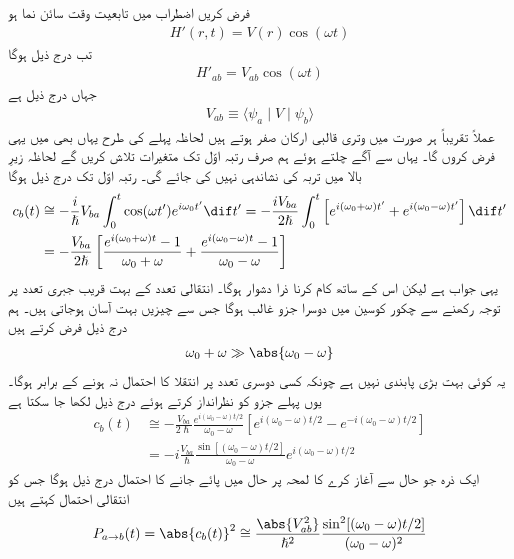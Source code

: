 
فرض کریں اضطراب میں تابعیت وقت سائن نما ہو 
\begin{align}
	H'(r, t) = V(r)\cos(\omega t)
\end{align}
تب درج ذیل ہوگا
\begin{align}
	H'_{ab}=V_{ab}\cos(\omega t)
\end{align}
جہاں  درج ذیل ہے
\begin{align}
	V_{ab}\equiv\langle\psi_a\mid V\mid\psi_b\rangle
\end{align}
عملاً تقریباً ہر صورت میں وتری قالبی ارکان صفر ہوتے ہیں لحاظہ پہلے کی طرح یہاں بھی میں یہی فرض کروں گا۔ یہاں سے آگے چلتے ہوئے ہم صرف رتبہ اوّل تک متغیرات تلاش کریں گے لحاظہ زیرِ بالا میں تربہ کی نشاندہی نہیں کی جائے گی۔ رتبہ اوّل تک درج ذیل ہوگا  
\begin{align}
	c_b(t) &\cong-\frac{i}{\hslash}V_{ba}\int_{0}^{t}\cos(\omega t')e^{i\omega_0 t'}\dif t' = -\frac{iV_{ba}}{2\hslash}\int_{0}^{t}\left[e^{i(\omega_0+\omega)t'}+e^{i(\omega_0-\omega)t'}\right]\dif t' \nonumber \\
	&=-\frac{V_{ba}}{2\hslash}\left[\frac{e^{i(\omega_0+\omega)t}-1}{\omega_0+\omega}+\frac{e^{i(\omega_0-\omega)t}-1}{\omega_0-\omega}\right]
\end{align}
یہی جواب ہے لیکن اس کے ساتھ کام کرنا ذرا دشوار ہوگا۔ انتقالی تعدد  کے بہت قریب جبری تعدد  پر توجہ رکھنے سے چکور کوسین میں دوسرا جزو غالب ہوگا جس سے چیزیں بہت آسان ہوجاتی ہیں۔ ہم درج ذیل فرض کرتے ہیں
\begin{align}
	\omega_0+\omega\gg\abs{\omega_0-\omega}
\end{align}
یہ کوئی بہت بڑی پابندی نہیں ہے چونکہ کسی دوسری تعدد پر انتقلا کا احتمال نہ ہونے کے برابر ہوگا۔ یوں پہلے جزو کو نظرانداز کرتے ہوئے درج ذیل لکھا جا سکتا ہے
\begin{align}
	c_b(t) &\cong-\frac{V_{ba}}{2\hslash}\frac{e^{i(\omega_0-\omega)t/2}}{\omega_0-\omega}\left[e^{i(\omega_0-\omega)t/2}-e^{-i(\omega_0-\omega)t/2}\right]\nonumber \\
	&=-i\frac{V_{ba}}{\hslash}\frac{\sin[(\omega_0-\omega)t/2]}{\omega_0-\omega}e^{i(\omega_0-\omega)t/2}
\end{align}
ایک ذرہ جو حال  سے آغاز کرے کا لمحہ پر حال  میں پائے جانے کا احتمال درج ذیل ہوگا جس کو انتقالی احتمال کہتے ہیں 
\begin{align}
	P_{a\to b}(t)=\abs{c_b(t)}^2\cong\frac{\abs{V_{ab}^2}}{\hslash^2}\frac{\sin^2[(\omega_0-\omega)t/2]}{(\omega_0-\omega)^2}
\end{align}
